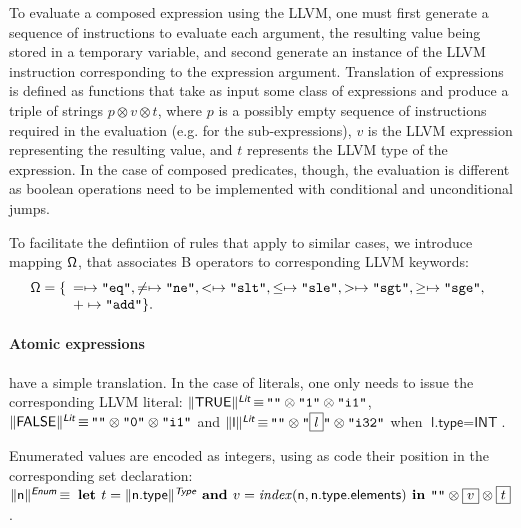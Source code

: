 \documentclass{llncs}
\newcommand{\trad}[2]{\ensuremath{\lVert \textsf{#1} \rVert^{\textit{#2}}}}
\DeclareMathOperator{\isdef}{\equiv}
\newcommand{\llvm}[1]{\texttt{#1}}
\newcommand{\B}[1]{\textsf{#1}}
\newcommand{\LET}[0]{\textbf{ let }}
\newcommand{\IN}[0]{\textbf{ in }}
\newcommand{\AND}[0]{\textbf{ and }}
\newcommand{\PH}[1]{\framebox{$#1$}}
\newcommand{\sep}[0]{\otimes}
\newcommand{\opmap}[0]{\ensuremath{\sf\Omega}}
\begin{document}
To evaluate a composed expression using the LLVM, one must first generate a
sequence of instructions to evaluate each argument, the resulting value being
stored in a temporary variable, and second generate an instance of the LLVM
instruction corresponding to the expression argument.  Translation of
expressions is defined as functions that take as input some class of expressions
and produce a triple of strings $p \sep v \sep t$, where $p$ is a possibly empty
sequence of instructions required in the evaluation (e.g.  for the
sub-expressions), $v$ is the LLVM expression representing the resulting value,
and $t$ represents the LLVM type of the expression. In the case of composed
predicates, though, the evaluation is different as boolean operations need to be
implemented with conditional and unconditional jumps.

To facilitate the defintiion of rules that apply to similar cases, we introduce
mapping $\opmap$, that associates B operators to corresponding LLVM keywords:
$$\opmap = \{
\begin{array}[t]{l}
  = \mapsto \llvm{"eq"},
  \ne \mapsto \llvm{"ne"},
  < \mapsto \llvm{"slt"},
  \le \mapsto \llvm{"sle"},
  > \mapsto \llvm{"sgt"},
  \ge \mapsto \llvm{"sge"}, \\
  + \mapsto \llvm{"add"} \}.
  \end{array}
$$

\paragraph{Atomic expressions} have a simple translation. In the case of
literals, one only needs to issue the corresponding LLVM literal:
$\trad{TRUE}{\B{Lit}} \isdef \llvm{""} \sep \llvm{"1"} \sep \llvm{"i1"}$,
$\trad{FALSE}{\B{Lit}} \isdef \llvm{""} \sep \llvm{"0"} \sep \llvm{"i1"}$ and
$\trad{l}{\B{Lit}} \isdef \llvm{""} \sep \llvm{"\PH{l}"} \sep \llvm{"i32"}$ when
$\B{l.type} = \B{INT}$.

Enumerated values are encoded as integers, using as code their position in the
corresponding set declaration: $\trad{\B{n}}{\B{Enum}} \isdef \LET t =
\trad{\B{n.type}}{\B{Type}} \AND v = \mathit{index}(\B{n}, \B{n.type.elements})
\IN \llvm{""} \sep \PH{v} \sep \PH{t}$.
\end{document}
